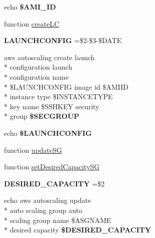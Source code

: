 \begin{DoxyCompactItemize}
\item 
\hypertarget{aws-toolkit_8bash_afbb1506ea909035f3fafe5f91a3e3f8e}{echo {\bfseries \$\-A\-M\-I\-\_\-\-I\-D}}\label{aws-toolkit_8bash_afbb1506ea909035f3fafe5f91a3e3f8e}

\item 
function \hyperlink{aws-toolkit_8bash_a79e86254590fd77e490803185cfe540a}{create\-L\-C}
\item 
\hypertarget{aws-toolkit_8bash_afbc18f185507f9d2b23548fcaa6fe44d}{{\bfseries L\-A\-U\-N\-C\-H\-C\-O\-N\-F\-I\-G} =\$2-\/\$3-\/\$D\-A\-T\-E}\label{aws-toolkit_8bash_afbc18f185507f9d2b23548fcaa6fe44d}

\item 
\hypertarget{aws-toolkit_8bash_aa588bd1203a37bfc3654977ae5b61be7}{aws autoscaling create launch \\*
configuration launch \\*
configuration name \\*
\$L\-A\-U\-N\-C\-H\-C\-O\-N\-F\-I\-G image id \$A\-M\-I\-I\-D \\*
instance type \$I\-N\-S\-T\-A\-N\-C\-E\-T\-Y\-P\-E \\*
key name \$S\-S\-H\-K\-E\-Y security \\*
group {\bfseries \$\-S\-E\-C\-G\-R\-O\-U\-P}}\label{aws-toolkit_8bash_aa588bd1203a37bfc3654977ae5b61be7}

\item 
\hypertarget{aws-toolkit_8bash_ac9e169e876e3115128c4be64ac5e7d28}{echo {\bfseries \$\-L\-A\-U\-N\-C\-H\-C\-O\-N\-F\-I\-G}}\label{aws-toolkit_8bash_ac9e169e876e3115128c4be64ac5e7d28}

\item 
function \hyperlink{aws-toolkit_8bash_af07343fdf589f5f3ea6d9b9aa21f9af9}{update\-S\-G}
\item 
function \hyperlink{aws-toolkit_8bash_aef049e0894a88703f05ccebcc7048999}{set\-Desired\-Capacity\-S\-G}
\item 
\hypertarget{aws-toolkit_8bash_a54c5a8c4c6b7f80406699b707024dfdc}{{\bfseries D\-E\-S\-I\-R\-E\-D\-\_\-\-C\-A\-P\-A\-C\-I\-T\-Y} =\$2}\label{aws-toolkit_8bash_a54c5a8c4c6b7f80406699b707024dfdc}

\item 
\hypertarget{aws-toolkit_8bash_ad1b3d209453864e8d379ac5b001133e0}{echo aws autoscaling update \\*
auto scaling group auto \\*
scaling group name \$A\-S\-G\-N\-A\-M\-E \\*
desired capacity {\bfseries \$\-D\-E\-S\-I\-R\-E\-D\-\_\-\-C\-A\-P\-A\-C\-I\-T\-Y}}\label{aws-toolkit_8bash_ad1b3d209453864e8d379ac5b001133e0}


\end{DoxyCompactItemize}
